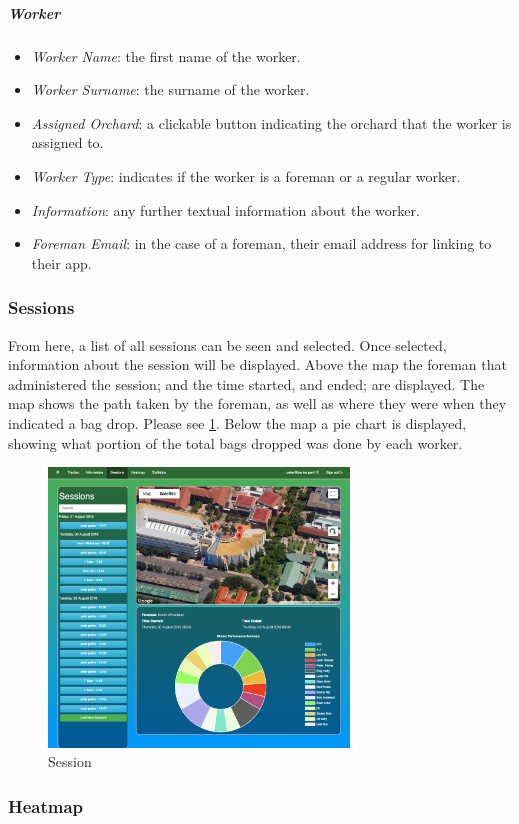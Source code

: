 \documentclass[11pt]{article}
\begin{document}
\subparagraph{Worker}
\begin{itemize}
\item \textit{Worker Name}: the first name of the worker.
\item \textit{Worker Surname}: the surname of the worker.
\item \textit{Assigned Orchard}: a clickable button indicating the orchard that the worker is assigned to.
\item \textit{Worker Type}: indicates if the worker is a foreman or a regular worker.
\item \textit{Information}: any further textual information about the worker.
\item \textit{Foreman Email}: in the case of a foreman, their email address for linking to their app.
\end{itemize}
\subsubsection{Sessions}
\label{webSessions}
From here, a list of all sessions can be seen and selected. Once selected, information about the session will be displayed. Above the map the foreman that administered the session; and the time started, and ended; are displayed. The map shows the path taken by the foreman, as well as where they were when they indicated a bag drop. Please see \ref{webSession}. Below the map a pie chart is displayed, showing what portion of the total bags dropped was done by each worker.

\begin{figure}
 \centering
 \includegraphics[width=8cm, keepaspectratio]{Images/UsingSystem/WebSession.png}
 \caption{Session}
 \label{webSession}
\end{figure}

\subsubsection{Heatmap}
\label{webHeatmap}
\end{document}
